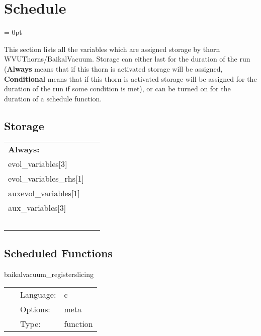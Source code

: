 
\section{Schedule} 


\parskip = 0pt


\noindent This section lists all the variables which are assigned storage by thorn WVUThorns/BaikalVacuum.  Storage can either last for the duration of the run ({\bf Always} means that if this thorn is activated storage will be assigned, {\bf Conditional} means that if this thorn is activated storage will be assigned for the duration of the run if some condition is met), or can be turned on for the duration of a schedule function.


\subsection*{Storage}

\hspace{5mm}

 \begin{tabular*}{160mm}{ll} 

{\bf Always:}&  ~ \\ 
 evol\_variables[3] & ~\\ 
 evol\_variables\_rhs[1] & ~\\ 
 auxevol\_variables[1] & ~\\ 
 aux\_variables[3] & ~\\ 
~ & ~\\ 
\end{tabular*} 


\subsection*{Scheduled Functions}
\vspace{5mm}


\hspace{5mm} baikalvacuum\_registerslicing 

\hspace{5mm}{\it register 3+1 slicing condition } 


\hspace{5mm}

 \begin{tabular*}{160mm}{cll} 
~ & Language:  & c \\ 
~ & Options:  & meta \\ 
~ & Type:  & function \\ 
\end{tabular*} 


